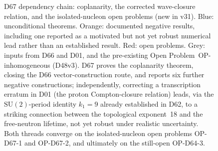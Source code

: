 \documentclass[11pt,a4paper]{article}
\theoremstyle{plain}
\theoremstyle{definition}
\theoremstyle{remark}
\begin{document}
\begin{figure}[H]
{%
}
\caption{D67 dependency chain: coplanarity, the corrected wave-closure relation, and the isolated-nucleon open problems (new in v31). \textcolor{proofblue}{Blue}: unconditional theorems. Orange: documented negative results, including one reported as a motivated but not yet robust numerical lead rather than an established result. \textcolor{openproblemred}{Red}: open problems. Grey: inputs from D66 and D01, and the pre-existing Open Problem~OP-inhomogeneous (D48v3). D67 proves the coplanarity theorem, closing the D66 vector-construction route, and reports six further negative constructions; independently, correcting a transcription erratum in D01 (the proton Compton-closure relation) leads, via the $\mathrm{SU}(2)$-period identity $k_1=9$ already established in D62, to a striking connection between the topological exponent~18 and the free-neutron lifetime, not yet robust under realistic uncertainty. Both threads converge on the isolated-nucleon open problems OP-D67-1 and OP-D67-2, and ultimately on the still-open OP-D64-3.}
\label{fig:dependency_D67}
\end{figure}
\end{document}
